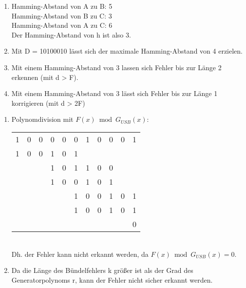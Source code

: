 \documentclass[12pt]{scrartcl}
\begin{document}
\setcounter{exnum}{1}
    \begin{enumerate}[label=(\alph*)]
        \item   Hamming-Abstand von A zu B: 5\\
                Hamming-Abstand von B zu C: 3\\
                Hamming-Abstand von A zu C: 6\\
                Der Hamming-Abstand von h ist also 3.
        \item   Mit D = 10100010 lässt sich der maximale Hamming-Abstand von 4 erzielen.
        \item   Mit einem Hamming-Abstand von 3 lassen sich Fehler bis zur Länge 2 erkennen (mit d > F).
        \item   Mit einem Hamming-Abstand von 3 lässt sich Fehler bis zur Länge 1 korrigieren (mit d > 2F)\\
    \end{enumerate}
 
\setcounter{exnum}{2}
    \begin{enumerate}[label=(\alph*)]
        \item Polynomdivision mit $F(x) \bmod G_{USB}(x)$:\\
        \begin{tabular}{c c c c c c c c c c c}
        1 & 0 & 0 & 0 & 0 & 0 & 1 & 0 & 0 & 0 & 1 \\
        1 & 0 & 0 & 1 & 0 & 1 \\
        \hline
          &   &   & 1 & 0 & 1 & 1 & 0 & 0 \\
          &   &   & 1 & 0 & 0 & 1 & 0 & 1 \\
        \hline
          &   &   &   &   & 1 & 0 & 0 & 1 & 0 & 1 \\
          &   &   &   &   & 1 & 0 & 0 & 1 & 0 & 1 \\
        \hline
          &   &   &   &   &   &   &   &   &   & 0 \\
        \end{tabular}\\
        Dh. der Fehler kann nicht erkannt werden, da $F(x) \bmod G_{USB}(x) = 0$.
        \item   Da die Länge des Bündelfehlers k größer ist als der Grad des Generatorpolynoms r, 
        kann der Fehler nicht sicher erkannt werden. \\
    \end{enumerate}
\end{document}
